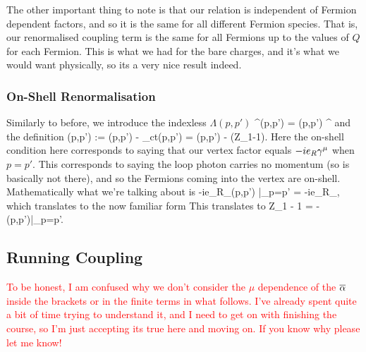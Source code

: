 The other important thing to note is that our relation is independent of Fermion dependent factors, and so it is the same for all different Fermion species. That is, our renormalised coupling term is the same for all Fermions up to the values of $Q$ for each Fermion. This is what we had for the bare charges, and it's what we would want physically, so its a very nice result indeed. 

\subsubsection{On-Shell Renormalisation}

Similarly to before, we introduce the indexless $\Lambda(p,p')$
\bse 
    \Lambda^{\mu}(p,p') = \Lambda(p,p') \g^{\mu}
\ese 
and the definition
\bse 
    \overline{\Lambda}(p,p') := \Lambda(p,p') - \Lambda_{ct}(p,p') = \Lambda(p,p') - (Z_1-1).
\ese 
Here the on-shell condition here corresponds to saying that our vertex factor equals $-ie_R\gamma^{\mu}$ when $p=p'$. This corresponds to saying the loop photon carries no momentum (so is basically not there), and so the Fermions coming into the vertex are on-shell. Mathematically what we're talking about is 
\bse 
    -ie_R\overline{\Gamma}_{\mu}(p,p') \big|_{p=p'} = -ie_R\g_{\mu},
\ese 
which translates to the now familiar form 
This translates to 
\bse 
    Z_1 - 1 = - \Lambda(p,p')\big|_{p=p'}.
\ese 

\subsection{Running Coupling}

\br 
    \textcolor{red}{To be honest, I am confused why we don't consider the $\mu$ dependence of the $\overline{\alpha}$ inside the brackets or in the finite terms in what follows. I've already spent quite a bit of time trying to understand it, and I need to get on with finishing the course, so I'm just accepting its true here and moving on. If you know why please let me know!}
\er 

